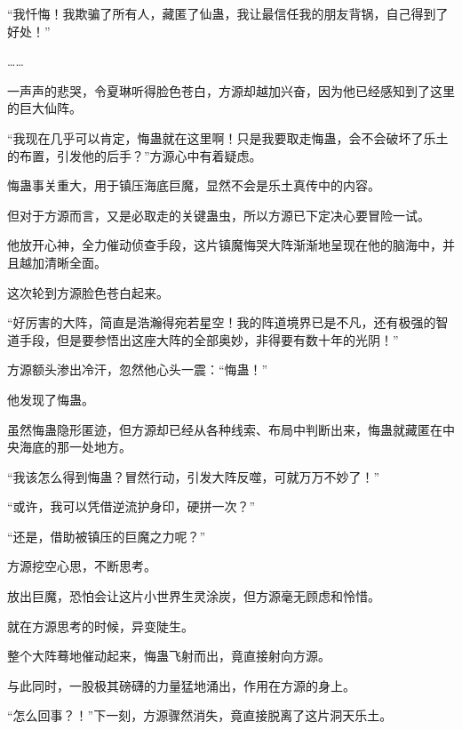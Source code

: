\begin{this_body}
“我忏悔！我欺骗了所有人，藏匿了仙蛊，我让最信任我的朋友背锅，自己得到了好处！”

……

一声声的悲哭，令夏琳听得脸色苍白，方源却越加兴奋，因为他已经感知到了这里的巨大仙阵。

“我现在几乎可以肯定，悔蛊就在这里啊！只是我要取走悔蛊，会不会破坏了乐土的布置，引发他的后手？”方源心中有着疑虑。

悔蛊事关重大，用于镇压海底巨魔，显然不会是乐土真传中的内容。

但对于方源而言，又是必取走的关键蛊虫，所以方源已下定决心要冒险一试。

他放开心神，全力催动侦查手段，这片镇魔悔哭大阵渐渐地呈现在他的脑海中，并且越加清晰全面。

这次轮到方源脸色苍白起来。

“好厉害的大阵，简直是浩瀚得宛若星空！我的阵道境界已是不凡，还有极强的智道手段，但是要参悟出这座大阵的全部奥妙，非得要有数十年的光阴！”

方源额头渗出冷汗，忽然他心头一震：“悔蛊！”

他发现了悔蛊。

虽然悔蛊隐形匿迹，但方源却已经从各种线索、布局中判断出来，悔蛊就藏匿在中央海底的那一处地方。

“我该怎么得到悔蛊？冒然行动，引发大阵反噬，可就万万不妙了！”

“或许，我可以凭借逆流护身印，硬拼一次？”

“还是，借助被镇压的巨魔之力呢？”

方源挖空心思，不断思考。

放出巨魔，恐怕会让这片小世界生灵涂炭，但方源毫无顾虑和怜惜。

就在方源思考的时候，异变陡生。

整个大阵蓦地催动起来，悔蛊飞射而出，竟直接射向方源。

与此同时，一股极其磅礴的力量猛地涌出，作用在方源的身上。

“怎么回事？！”下一刻，方源骤然消失，竟直接脱离了这片洞天乐土。

\end{this_body}

